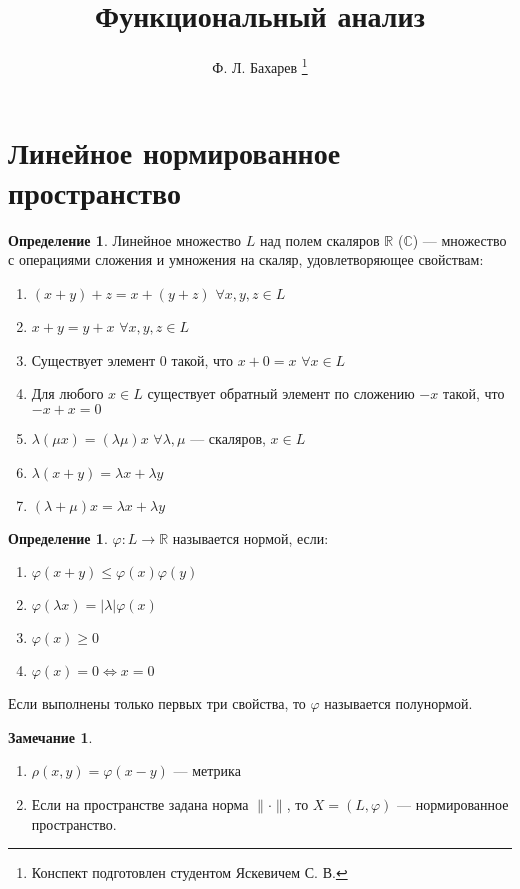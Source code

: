 \documentclass[11pt,openany,a4paper]{scrartcl}
\author{Ф. Л. Бахарев \thanks{Конспект подготовлен студентом Яскевичем С. В.}}
\title{Функциональный анализ}
\theoremstyle{plain}
\theoremstyle{definition}
\newtheorem{definition}[theorem]{Определение}
\newtheorem{remark}[theorem]{Замечание}
\newcommand\mb{\mathbb}
\newcommand\real{\mb R}
\newcommand{\complex}{\mb C}
\begin{document}
\maketitle

\tableofcontents

\pagebreak

\section{Линейное нормированное пространство}

\begin{definition}
	Линейное множество $L$ над полем скаляров $\real$ ($\complex$) — множество с
	операциями сложения и умножения на скаляр, удовлетворяющее свойствам:
	\begin{enumerate}
		\item $(x + y) + z = x + (y + z)$ $\forall x,y,z \in L$
		\item $x + y = y + x$ $\forall x,y,z \in L$
		\item Существует элемент $0$ такой, что $x + 0 = x$ $\forall x \in L$
		\item Для любого $x \in L$ существует обратный элемент по сложению $-x$ такой, что
		$-x + x = 0$
		\item $\lambda(\mu x) = (\lambda \mu) x$ $\forall \lambda, \mu$ — скаляров,
		$x \in L$
		\item $\lambda(x + y) = \lambda x + \lambda y$
		\item $(\lambda + \mu)x = \lambda x + \lambda y$
	\end{enumerate}
\end{definition}

\begin{definition}
	$\varphi: L \to \real$ называется нормой, если:
	\begin{enumerate}
		\item $\varphi(x + y) \leqslant \varphi(x) \varphi(y)$
		\item $\varphi(\lambda x) = |\lambda|\varphi(x)$
		\item $\varphi(x) \geqslant 0$
		\item $\varphi (x) = 0 \iff x = 0$
	\end{enumerate}
	
	Если выполнены только первых три свойства, то $\varphi$ называется полунормой.
\end{definition}
\begin{remark}
	\begin{enumerate}
		\item $\rho (x, y) = \varphi(x - y)$ — метрика
		\item Если на пространстве задана норма $\|\cdot\|$, то $X = (L, \varphi)$ — 
		нормированное пространство.
	\end{enumerate}
\end{remark}
\end{document}
